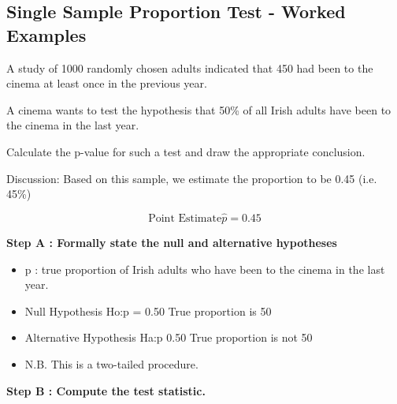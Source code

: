 \documentclass[]{report}
\begin{document}
%		
%			
%			
%			
%			




\subsection{ Single Sample Proportion Test - Worked Examples}

A study of 1000 randomly chosen adults indicated that 450 had been to the cinema at least once in the previous year.

A cinema wants to test the hypothesis that 50\% of all Irish adults have been to the cinema in the last year.

Calculate the p-value for such a test and draw the appropriate conclusion.

Discussion: Based on this sample, we estimate the proportion to be 0.45  (i.e. 45\%)

\[ \mbox{Point Estimate} \hat{p} = 0.45\]

\noindent \textbf{Step A : Formally state the null and alternative hypotheses}

\begin{itemize}
	\item p : true proportion of Irish adults who have been to the cinema in the last year.
	
	\item	Null Hypothesis               Ho:p = 0.50        True proportion is 50%
	
	\item Alternative Hypothesis      Ha:p 0.50        True proportion is not 50%
	
	
	\item	N.B. This is a two-tailed procedure.
\end{itemize}




\noindent \textbf{Step B : Compute the test statistic.}
\end{document}
